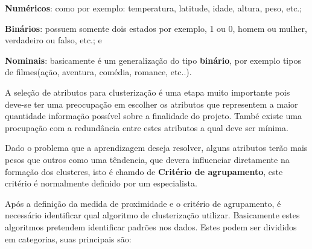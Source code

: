 \begin{alineas}
	\item \textbf{Numéricos}: como por exemplo: temperatura, latitude, idade, altura, peso, etc.; 
	\item \textbf{Binários}: possuem somente dois estados por exemplo, 1 ou 0, homem ou mulher, verdadeiro ou falso, etc.; e
	\item \textbf{Nominais}: basicamente é um generalização do tipo \textbf{binário}, por exemplo tipos de filmes(ação, aventura, comédia, romance, etc..).  
\end{alineas}

A seleção de atributos para clusterização é uma etapa muito importante pois deve-se ter uma preocupação em escolher os atributos
que representem a maior quantidade informação possível sobre a finalidade do projeto. També existe uma procupação com a redundância
entre estes atributos a qual deve ser mínima.

Dado o problema que a aprendizagem deseja resolver, alguns atributos terão mais pesos que outros como uma têndencia, que devera influenciar
diretamente na formação dos clusteres, isto é chamdo de \textbf{Critério de agrupamento}, este critério é normalmente definido por um especialista.

Após a definição da medida de proximidade e o critério de agrupamento, é necessário identificar qual algoritmo de clusterização utilizar.
Basicamente estes algoritmos pretendem identificar padrões nos dados. Estes podem ser divididos em categorias, suas principais são:

